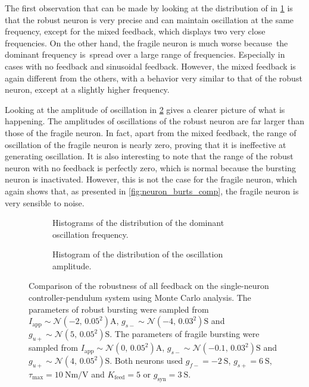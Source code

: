 The first observation that can be made by looking at the distribution of in \cref{fig:single_monte_freq} is that the robust neuron is very precise and can maintain oscillation at the same frequency, except for the mixed feedback, which displays two very close frequencies.
On the other hand, the fragile neuron is much worse because the dominant frequency is spread over a large range of frequencies.
Especially in cases with no feedback and sinusoidal feedback.
However, the mixed feedback is again different from the others, with a behavior very similar to that of the robust neuron, except at a slightly higher frequency.

Looking at the amplitude of oscillation in \cref{fig:single_monte_range} gives a clearer picture of what is happening.
The amplitudes of oscillations of the robust neuron are far larger than those of the fragile neuron.
In fact, apart from the mixed feedback, the range of oscillation of the fragile neuron is nearly zero, proving that it is ineffective at generating oscillation.
It is also interesting to note that the range of the robust neuron with no feedback is perfectly zero, which is normal because the bursting neuron is inactivated.
However, this is not the case for the fragile neuron, which again shows that, as presented in \cref{fig:neuron_burts_comp}, the fragile neuron is very sensible to noise.

\begin{figure}[!htbp]
    \centering
    \begin{subfigure}[t][.43\textheight][b]{\textwidth}
        \centering
        \caption{Histograms of the distribution of the dominant oscillation frequency.}
        \label{fig:single_monte_freq}
    \end{subfigure}
    
    \begin{subfigure}[b][.43\textheight][t]{\textwidth}
        \centering
        \caption{Histogram of the distribution of the oscillation amplitude.}
        \label{fig:single_monte_range}
    \end{subfigure}
    \caption{Comparison of the robustness of all feedback on the single-neuron controller-pendulum system using Monte Carlo analysis. The parameters of robust bursting were sampled from $I_\text{app} \sim \mathcal{N}\left(-2,\, 0.05^2\right) \unit{\ampere}$, $g_{s-} \sim \mathcal{N}\left(-4,\, 0.03^2\right) \unit{\siemens}$ and $g_{u+} \sim \mathcal{N}\left(5,\, 0.05^2\right) \unit{\siemens}$. The parameters of fragile bursting were sampled from $I_\text{app} \sim \mathcal{N}\left(0,\, 0.05^2\right) \unit{\ampere}$, $g_{s-} \sim \mathcal{N}\left(-0.1,\, 0.03^2\right) \unit{\siemens}$ and $g_{u+} \sim \mathcal{N}\left(4,\, 0.05^2\right) \unit{\siemens}$. Both neurons used $g_{f-} = \qty{-2}{\siemens}$, $g_{s+} = \qty{6}{\siemens}$, $\tau_\text{max} = \qty{10}{\newton\meter\per\volt}$ and $K_\text{feed} = 5$ or $g_{\text{syn}} = \qty{3}{\siemens}$.}
    \label{fig:single_monte}
\end{figure}

